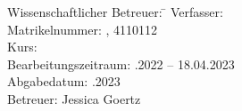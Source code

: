\begin{titlepage}
\begin{center}
\begin{minipage}{\textwidth}
    \begin{tabbing}
        Wissenschaftlicher Betreuer: \hspace{0.85cm}\=\kill
        Verfasser: \> \DerAutorDerArbeit \\[1.5mm]
        Matrikelnummer: , 4110112 \\[1.5mm]
        Kurs: \> \DieKursbezeichnung \\[1.5mm]
        Bearbeitungszeitraum: .2022 -- 18.04.2023\\
        Abgabedatum: .2023\\
        Betreuer: \> Jessica Goertz\\
    \end{tabbing}
    
    \end{minipage}
    
    \end{center}
    
    \end{titlepage}